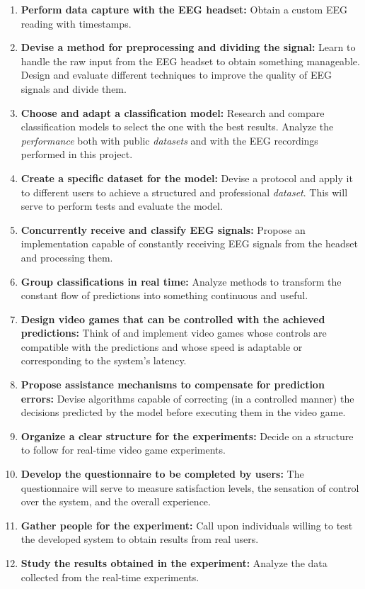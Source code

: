 \begin{enumerate}[label=\Alph*.]
    \item \textbf{Perform data capture with the EEG headset:} Obtain a custom EEG reading with timestamps.
    \item \textbf{Devise a method for preprocessing and dividing the signal:} Learn to handle the raw input from the EEG headset to obtain something manageable. Design and evaluate different techniques to improve the quality of EEG signals and divide them.
    \item \textbf{Choose and adapt a classification model:} Research and compare classification models to select the one with the best results. Analyze the \textit{performance} both with public \textit{datasets} and with the EEG recordings performed in this project.
    \item \textbf{Create a specific dataset for the model:} Devise a protocol and apply it to different users to achieve a structured and professional \textit{dataset}. This will serve to perform tests and evaluate the model.
    \item \textbf{Concurrently receive and classify EEG signals:} Propose an implementation capable of constantly receiving EEG signals from the headset and processing them.
    \item \textbf{Group classifications in real time:} Analyze methods to transform the constant flow of predictions into something continuous and useful.
    \item \textbf{Design video games that can be controlled with the achieved predictions:} Think of and implement video games whose controls are compatible with the predictions and whose speed is adaptable or corresponding to the system's latency.
    \item \textbf{Propose assistance mechanisms to compensate for prediction errors:} Devise algorithms capable of correcting (in a controlled manner) the decisions predicted by the model before executing them in the video game.
    \item \textbf{Organize a clear structure for the experiments:} Decide on a structure to follow for real-time video game experiments.
    \item \textbf{Develop the questionnaire to be completed by users:} The questionnaire will serve to measure satisfaction levels, the sensation of control over the system, and the overall experience.
    \item \textbf{Gather people for the experiment:} Call upon individuals willing to test the developed system to obtain results from real users.
    \item \textbf{Study the results obtained in the experiment:} Analyze the data collected from the real-time experiments.
\end{enumerate}

